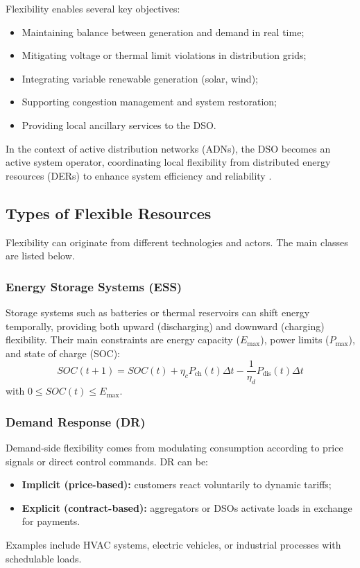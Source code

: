 \documentclass[11pt]{article}
\begin{document}
	Flexibility enables several key objectives:
	\begin{itemize}
		\item Maintaining balance between generation and demand in real time;
		\item Mitigating voltage or thermal limit violations in distribution grids;
		\item Integrating variable renewable generation (solar, wind);
		\item Supporting congestion management and system restoration;
		\item Providing local ancillary services to the DSO.
	\end{itemize}
	
	In the context of active distribution networks (ADNs), the DSO becomes an active system operator, coordinating local flexibility from distributed energy resources (DERs) to enhance system efficiency and reliability \cite{CEDEC2019_flexibility,entsoe2023_flexibility}.
	
	\subsection{Types of Flexible Resources}
	
	Flexibility can originate from different technologies and actors.  
	The main classes are listed below.
	
	\subsubsection*{Energy Storage Systems (ESS)}
	Storage systems such as batteries or thermal reservoirs can shift energy temporally, providing both upward (discharging) and downward (charging) flexibility.  
	Their main constraints are energy capacity ($E_\text{max}$), power limits ($P_\text{max}$), and state of charge (SOC):
	\[
	SOC(t+1) = SOC(t) + \eta_c P_\text{ch}(t)\Delta t - \frac{1}{\eta_d} P_\text{dis}(t)\Delta t
	\]
	with $0 \le SOC(t) \le E_\text{max}$.
	
	\subsubsection*{Demand Response (DR)}
	Demand-side flexibility comes from modulating consumption according to price signals or direct control commands.  
	DR can be:
	\begin{itemize}
		\item \textbf{Implicit (price-based):} customers react voluntarily to dynamic tariffs;
		\item \textbf{Explicit (contract-based):} aggregators or DSOs activate loads in exchange for payments.
	\end{itemize}
	Examples include HVAC systems, electric vehicles, or industrial processes with schedulable loads.
	
\end{document}

